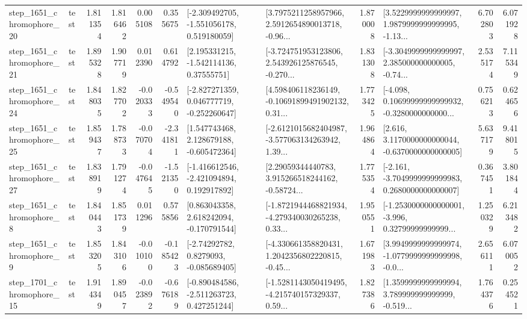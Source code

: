 \begin{tabular}{llrrrrllrlrr}
 step\_1651\_chromophore\_20 &      test &      1.811354 &    1.816462 &      0.005108 &  0.355675 &   [-2.309492705, -1.551056178, 0.519180059] &  [3.7975211258957966, 2.5912654890013718, -0.96... &       1.870008 &  [3.5229999999999997, 1.9879999999999995, -1.13... &            6.702803 &          6.071928 \\
 step\_1651\_chromophore\_21 &      test &      1.895328 &    1.907719 &      0.012390 &  0.614792 &     [2.195331215, -1.542114136, 0.37555751] &  [-3.724751953123806, 2.543926125876545, -0.270... &       1.831308 &  [-3.3049999999999997, 2.385000000000005, -0.74... &            2.535174 &          7.115349 \\
 step\_1651\_chromophore\_24 &      test &      1.848035 &    1.827702 &     -0.020333 & -0.549540 &   [-2.827271359, 0.046777719, -0.252260647] &  [4.598406118236149, -0.10691899491902132, 0.31... &       1.773425 &  [-4.098, 0.10699999999999932, -0.3280000000000... &            0.756213 &          0.624656 \\
 step\_1651\_chromophore\_25 &      test &      1.859437 &    1.788733 &     -0.070704 & -2.341811 &    [1.547743468, 2.128679188, -0.605472364] &  [-2.6121015682404987, -3.577063134263942, 1.39... &       1.964864 &   [2.616, 3.1170000000000044, -0.6370000000000005] &            5.637179 &          9.418015 \\
 step\_1651\_chromophore\_27 &      test &      1.838919 &    1.791274 &     -0.047645 & -1.521350 &   [-1.416612546, -2.421094894, 0.192917892] &  [2.29059344440783, 3.915266518244162, -0.58724... &       1.775354 &  [-2.161, -3.7049999999999983, 0.2680000000000007] &            0.367451 &          3.801844 \\
  step\_1651\_chromophore\_8 &      test &      1.840443 &    1.851739 &      0.011296 &  0.575856 &    [0.863043358, 2.618242094, -0.170791544] &  [-1.8721944468821934, -4.279340030265238, 0.33... &       1.950551 &  [-1.2530000000000001, -3.996, 0.32799999999999... &            1.250329 &          6.213482 \\
  step\_1651\_chromophore\_9 &      test &      1.853205 &    1.843106 &     -0.010100 & -0.185423 &      [-2.74292782, 0.8279093, -0.085689405] &  [-4.330661358820431, 1.2042356802220815, -0.45... &       1.671983 &  [3.9949999999999974, -1.0779999999999998, -0.0... &            2.656111 &          6.070052 \\
 step\_1701\_chromophore\_15 &      test &      1.914349 &    1.890457 &     -0.023892 & -0.676189 &   [-0.890484586, -2.511263723, 0.427251244] &  [-1.5281143050419495, -4.215740157329337, 0.59... &       1.827386 &  [1.3599999999999994, 3.789999999999999, -0.519... &            1.764376 &          0.254521 \\

\end{tabular}
